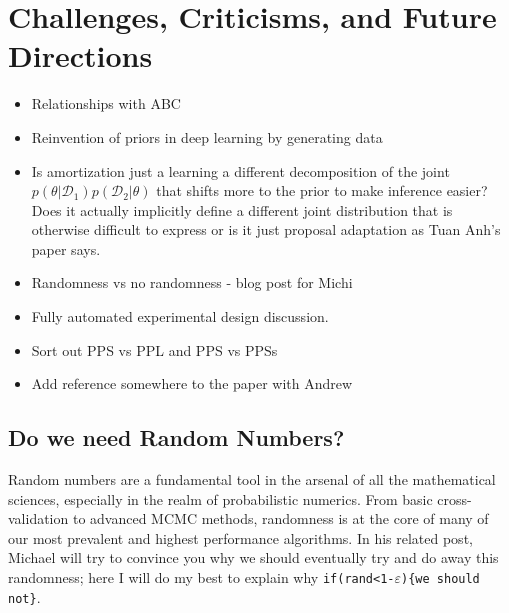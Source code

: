 
\chapter{Challenges, Criticisms, and Future Directions}
\label{chp:discussion}

\begin{itemize}
	\item Relationships with ABC
	\item Reinvention of priors in deep learning by generating data
	\item Is amortization just a learning a different decomposition of the joint 
	$p(\theta | \mathcal{D}_1)p(\mathcal{D}_2|\theta)$ that shifts more to the
	prior to make inference easier?  Does it actually implicitly define a different
	joint distribution that is otherwise difficult to express or is it just proposal
	adaptation as Tuan Anh's paper says.
	\item Randomness vs no randomness - blog post for Michi
	\item Fully automated experimental design discussion.
	\item Sort out PPS vs PPL and PPS vs PPSs
	\item Add reference somewhere to the paper with Andrew
\end{itemize}

\section{Do we need Random Numbers?}
	
Random numbers are a fundamental tool in the arsenal of all the mathematical sciences, especially in the realm of 
probabilistic numerics.  From basic cross-validation to advanced MCMC methods, randomness is at the core of 
many of our most prevalent and highest performance algorithms.  In his related post, Michael will 
try to convince you why we should eventually try and do away this randomness; here I will do my best to explain why
\texttt{if(rand<1-$\varepsilon$)\{we should not\}}.


